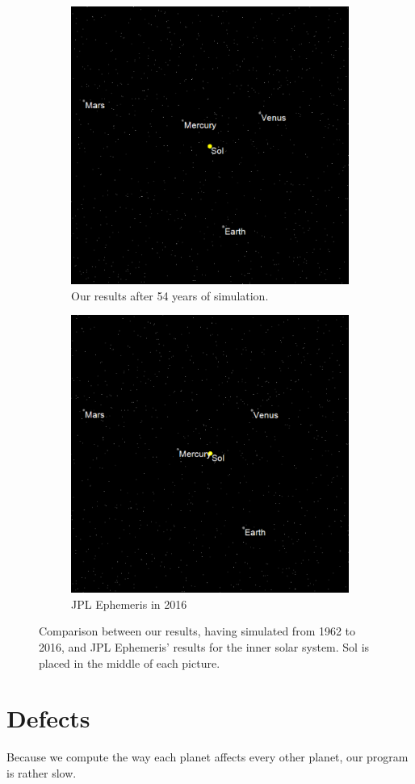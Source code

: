\documentclass[a4paper]{article}
\begin{document}
\begin{figure}[!ht]
\centering

\begin{subfigure}{0.5\textwidth}
\centering
\includegraphics[width=0.8\linewidth]{comparison-our}
\caption{Our results after 54 years of simulation.}
\label{comparison:ours}
\end{subfigure}%
\begin{subfigure}{0.5\textwidth}
\centering
\includegraphics[width=0.8\linewidth]{comparison-jple}
\caption{JPL Ephemeris in 2016}
\label{comparison:jple}
\end{subfigure}

\caption{Comparison between our results, having simulated from 1962 to 2016, and JPL Ephemeris' results for the inner solar system. Sol is placed in the middle of each picture.}
\label{comparison}
\end{figure}

\section{Defects}

Because we compute the way each planet affects every other planet, our program is rather slow.
\end{document}
